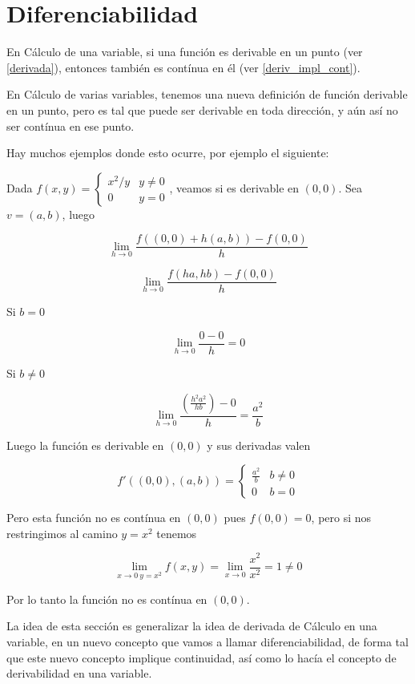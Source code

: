 
\chapter{Diferenciabilidad}

En Cálculo de una variable, si una función es derivable en un punto (ver \ref{derivada}), entonces también es contínua en él (ver \ref{deriv_impl_cont}).

En Cálculo de varias variables, tenemos una nueva definición de función derivable en un punto, pero es tal que puede ser derivable en toda dirección, y aún así no ser contínua en ese punto.

Hay muchos ejemplos donde esto ocurre, por ejemplo el siguiente:

\begin{example}
Dada $f(x,y) = \begin{cases} x^2/y & y \neq 0 \\ 0 & y=0 \end{cases}$, veamos si es derivable en $(0,0)$.  Sea $v = (a,b)$, luego

$$ \lim_{h \to 0} \frac{f((0,0) + h(a,b)) - f(0,0)}{h} $$

$$ \lim_{h \to 0} \frac{f(ha,hb) - f(0,0)}{h} $$

Si $b = 0$

$$ \lim_{h \to 0} \frac{0 - 0}{h} = 0 $$

Si $b \neq 0$

$$ \lim_{h \to 0} \frac{ \left( \frac{h^2 a^2}{hb} \right) - 0 }{h} = \frac{a^2}{b} $$

Luego la función es derivable en $(0,0)$ y sus derivadas valen

$$ f'((0,0),(a,b)) = \begin{cases} \frac{a^2}{b} & b \neq 0 \\ 0 & b = 0 \end{cases}$$

Pero esta función no es contínua en $(0,0)$ pues $f(0,0) = 0$, pero si nos restringimos al camino $y = x^2$ tenemos

$$ \lim_{ x \to 0 \ y=x^2 } f(x,y) = \lim_{x \to 0} \frac{x^2}{x^2} = 1 \neq 0$$

Por lo tanto la función no es contínua en $(0,0)$.
\end{example}

La idea de esta sección es generalizar la idea de derivada de Cálculo en una variable, en un nuevo concepto que vamos a llamar diferenciabilidad, de forma tal que este nuevo concepto implique continuidad, así como lo hacía el concepto de derivabilidad en una variable.

